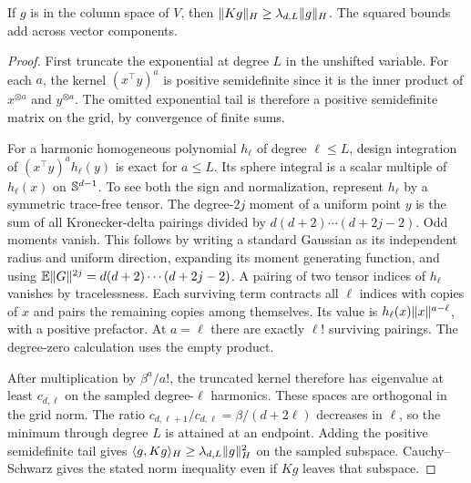 \begin{lemma}\label{lem:spectral}
If $g$ is in the column space of $V$, then $\lVert Kg\rVert_H\ge\lambda_{d,L}\lVert g\rVert_H$. The squared bounds add across vector components.
\end{lemma}
\begin{proof}
First truncate the exponential at degree $L$ in the unshifted variable. For each $a$, the kernel $(x^\top y)^a$ is positive semidefinite since it is the inner product of $x^{\otimes a}$ and $y^{\otimes a}$. The omitted exponential tail is therefore a positive semidefinite matrix on the grid, by convergence of finite sums.

For a harmonic homogeneous polynomial $h_\ell$ of degree $\ell\le L$, design integration of $(x^\top y)^a h_\ell(y)$ is exact for $a\le L$. Its sphere integral is a scalar multiple of $h_\ell(x)$ on $\mathbb S^{d-1}$. To see both the sign and normalization, represent $h_\ell$ by a symmetric trace-free tensor. The degree-$2j$ moment of a uniform point $y$ is the sum of all Kronecker-delta pairings divided by $d(d+2)\cdots(d+2j-2)$. Odd moments vanish. This follows by writing a standard Gaussian as its independent radius and uniform direction, expanding its moment generating function, and using $\mathbb E\lVert G\rVert^{2j}=d(d+2)\cdots(d+2j-2)$. A pairing of two tensor indices of $h_\ell$ vanishes by tracelessness. Each surviving term contracts all $\ell$ indices with copies of $x$ and pairs the remaining copies among themselves. Its value is $h_\ell(x)\lVert x\rVert^{a-\ell}$, with a positive prefactor. At $a=\ell$ there are exactly $\ell!$ surviving pairings. The degree-zero calculation uses the empty product.

After multiplication by $\beta^a/a!$, the truncated kernel therefore has eigenvalue at least $c_{d,\ell}$ on the sampled degree-$\ell$ harmonics. These spaces are orthogonal in the grid norm. The ratio $c_{d,\ell+1}/c_{d,\ell}=\beta/(d+2\ell)$ decreases in $\ell$, so the minimum through degree $L$ is attained at an endpoint. Adding the positive semidefinite tail gives $\langle g,Kg\rangle_H\ge\lambda_{d,L}\lVert g\rVert_H^2$ on the sampled subspace. Cauchy--Schwarz gives the stated norm inequality even if $Kg$ leaves that subspace.
\end{proof}

